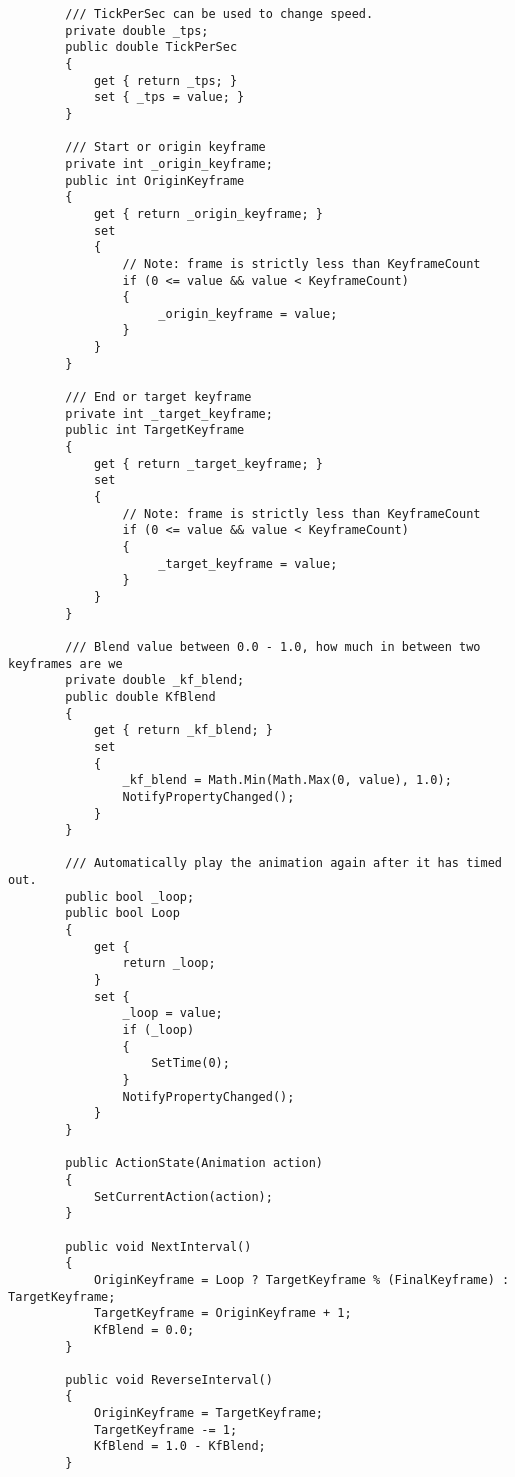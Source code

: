 \begin{scriptsize}
\begin{verbatim}
        /// TickPerSec can be used to change speed.
        private double _tps;
        public double TickPerSec
        {
            get { return _tps; }
            set { _tps = value; }
        }

        /// Start or origin keyframe
        private int _origin_keyframe;
        public int OriginKeyframe
        {
            get { return _origin_keyframe; }
            set
            {
                // Note: frame is strictly less than KeyframeCount
                if (0 <= value && value < KeyframeCount)
                {
                     _origin_keyframe = value;
                }
            }
        }

        /// End or target keyframe
        private int _target_keyframe;
        public int TargetKeyframe
        {
            get { return _target_keyframe; }
            set
            {
                // Note: frame is strictly less than KeyframeCount
                if (0 <= value && value < KeyframeCount)
                {
                     _target_keyframe = value;
                }
            }
        }

        /// Blend value between 0.0 - 1.0, how much in between two keyframes are we
        private double _kf_blend;
        public double KfBlend
        {
            get { return _kf_blend; }
            set
            {
                _kf_blend = Math.Min(Math.Max(0, value), 1.0);
                NotifyPropertyChanged();
            }
        }

        /// Automatically play the animation again after it has timed out.
        public bool _loop;
        public bool Loop
        {
            get {
                return _loop;
            }
            set { 
                _loop = value;
                if (_loop)
                {
                    SetTime(0);
                }
                NotifyPropertyChanged();
            }
        }

        public ActionState(Animation action)
        {
            SetCurrentAction(action);
        }

        public void NextInterval()
        {
            OriginKeyframe = Loop ? TargetKeyframe % (FinalKeyframe) : TargetKeyframe;
            TargetKeyframe = OriginKeyframe + 1;
            KfBlend = 0.0;
        }

        public void ReverseInterval()
        {
            OriginKeyframe = TargetKeyframe;
            TargetKeyframe -= 1;
            KfBlend = 1.0 - KfBlend;
        }


\end{verbatim}
\end{scriptsize}
